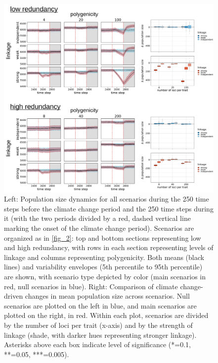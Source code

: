 \documentclass[9pt,twocolumn,twoside,lineno]{pnas-new}
\begin{document}
\begin{figure}[\sidecaptionrelwidth][t]
\centering
\includegraphics[width=17.8cm]{pub/figs/FIG_S2_Nt_over_time.jpg}
\caption{Left: Population size dynamics for all scenarios during the 250 time steps before the climate change period and the 250 time steps during it (with the two periods divided by a red, dashed vertical line marking the onset of the climate change period). Scenarios are organized as in \ref{fig_2}: top and bottom sections representing low and high redundancy, with rows in each section representing levels of linkage and columns representing polygenicity. Both means (black lines) and variability envelopes (5th percentile to 95th percentile) are shown, with scenario type depicted by color (main scenarios in red, null scenarios in blue). Right: Comparison of climate change-driven changes in mean population size across scenarios. Null scenarios are plotted on the left in blue, and main scenarios are plotted on the right, in red. Within each plot, scenarios are divided by the number of loci per trait (x-axis) and by the strength of linkage (shade, with darker hues representing stronger linkage). Asterisks above each box indicate level of significance (*=0.1, **=0.05, ***=0.005).}
\label{fig:fig_s2}
\end{figure}
\end{document}
